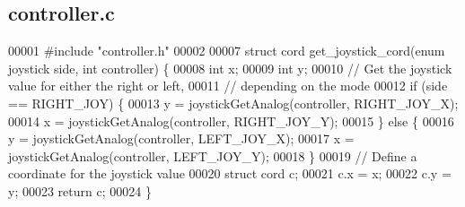 \subsection{controller.\+c}
\label{controller_8c_source}

\begin{DoxyCode}
00001 \textcolor{preprocessor}{#include "controller.h"}
00002 
00007 \textcolor{keyword}{struct }cord get_joystick_cord(enum joystick side, int controller) \{
00008   \textcolor{keywordtype}{int} x;
00009   \textcolor{keywordtype}{int} y;
00010   \textcolor{comment}{// Get the joystick value for either the right or left,}
00011   \textcolor{comment}{// depending on the mode}
00012   \textcolor{keywordflow}{if} (side == RIGHT_JOY) \{
00013     y = joystickGetAnalog(controller, RIGHT_JOY_X);
00014     x = joystickGetAnalog(controller, RIGHT_JOY_Y);
00015   \} \textcolor{keywordflow}{else} \{
00016     y = joystickGetAnalog(controller, LEFT_JOY_X);
00017     x = joystickGetAnalog(controller, LEFT_JOY_Y);
00018   \}
00019   \textcolor{comment}{// Define a coordinate for the joystick value}
00020   \textcolor{keyword}{struct }cord c;
00021   c.x = x;
00022   c.y = y;
00023   \textcolor{keywordflow}{return} c;
00024 \}
\end{DoxyCode}
